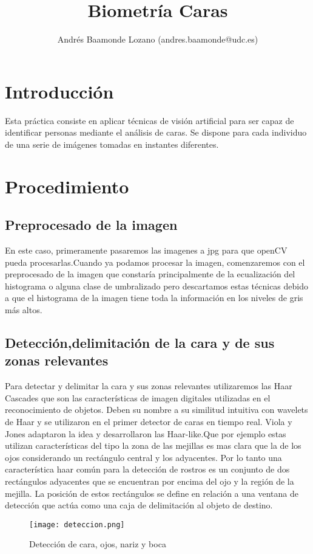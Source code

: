 \documentclass[12pt,a4paper]{article}
\title{Biometría Caras}
\author{Andrés Baamonde Lozano (andres.baamonde@udc.es)}
\begin{document}
\maketitle

\clearpage 

\tableofcontents

\clearpage 

\section{Introducción}
Esta práctica consiste en aplicar técnicas de visión artificial para ser capaz de identificar personas
mediante el análisis de caras. Se dispone para cada individuo de una serie de imágenes tomadas en
instantes diferentes.
\section{Procedimiento}
\subsection{Preprocesado de la imagen}
En este caso, primeramente pasaremos las imagenes a jpg para que openCV pueda procesarlas.Cuando ya podamos procesar la imagen, comenzaremos con el preprocesado de la imagen que constaría principalmente de la ecualización del histograma o alguna clase de umbralizado pero descartamos estas técnicas debido a que el histograma de la imagen tiene toda la información en los niveles de gris más altos.
\subsection{Detección,delimitación de la cara y de sus zonas relevantes}
Para detectar y delimitar la cara y sus zonas relevantes utilizaremos las Haar Cascades que son las características de imagen digitales utilizadas en el reconocimiento de objetos. Deben su nombre a su similitud intuitiva con wavelets de Haar y se utilizaron en el primer detector de caras en tiempo real. Viola y Jones adaptaron la idea y desarrollaron las Haar-like.Que por ejemplo estas utilizan características del tipo la zona de las mejillas es mas clara que la de los ojos considerando un rectángulo central y los adyacentes. Por lo tanto una característica haar común para la detección de rostros es un conjunto de dos rectángulos adyacentes que se encuentran por encima del ojo y la región de la mejilla. La posición de estos rectángulos se define en relación a una ventana de detección que actúa como una caja de delimitación al objeto de destino.
\begin{figure}[H]
\centering
\texttt{[image: deteccion.png]}
\caption{Detección de cara, ojos, nariz y boca}
\end{figure}
\end{document}
